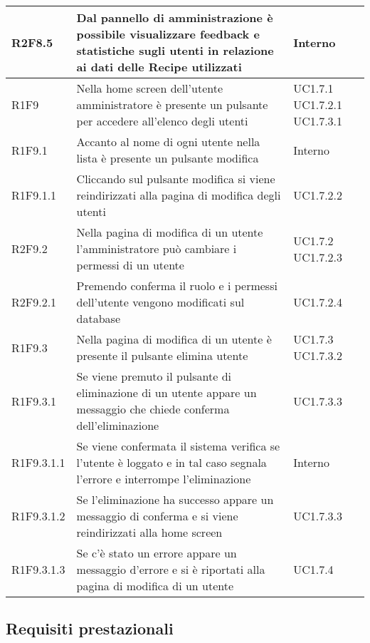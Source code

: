 \begin{center}
\begin{longtable}{| p{2cm} | p{8cm} | p{2cm} |}
		\hline
		R2F8.5  &  Dal pannello di amministrazione è possibile visualizzare feedback e statistiche sugli utenti in relazione ai dati delle Recipe utilizzati  &  Interno \\
		\hline
		R1F9 & Nella home screen dell'utente amministratore è presente un pulsante per accedere all'elenco degli utenti  &  UC1.7.1 \newline UC1.7.2.1 \newline UC1.7.3.1 \\
		\hline
		R1F9.1  &  Accanto al nome di ogni utente nella lista è presente un pulsante modifica  &  Interno \\
		\hline
		R1F9.1.1  &  Cliccando sul pulsante modifica si viene reindirizzati alla pagina di modifica degli utenti  &  UC1.7.2.2 \\
		\hline
		R2F9.2  &  Nella pagina di modifica di un utente l'amministratore può cambiare i permessi di un utente  &  UC1.7.2 \newline UC1.7.2.3 \\
		\hline
		R2F9.2.1  &  Premendo conferma il ruolo e i permessi dell'utente vengono modificati sul database  &  UC1.7.2.4 \\
		\hline
		R1F9.3  &  Nella pagina di modifica di un utente è presente il pulsante elimina utente  &  UC1.7.3 \newline UC1.7.3.2 \\
		\hline
		R1F9.3.1  &  Se viene premuto il pulsante di eliminazione di un utente appare un messaggio che chiede conferma dell'eliminazione  & UC1.7.3.3\\
		\hline
		R1F9.3.1.1  &  Se viene confermata il sistema verifica se l'utente è loggato e in tal caso segnala l'errore e interrompe l'eliminazione  & Interno \\
		\hline
		R1F9.3.1.2  &  Se l'eliminazione ha successo appare un messaggio di conferma e si viene reindirizzati alla home screen  & UC1.7.3.3\\
		\hline
		R1F9.3.1.3  &  Se c'è stato un errore appare un messaggio d'errore e si è riportati alla pagina di modifica di un utente  & UC1.7.4\\
		\hline

	\end{longtable}
	\egroup
\end{center}


\subsection{Requisiti prestazionali}


